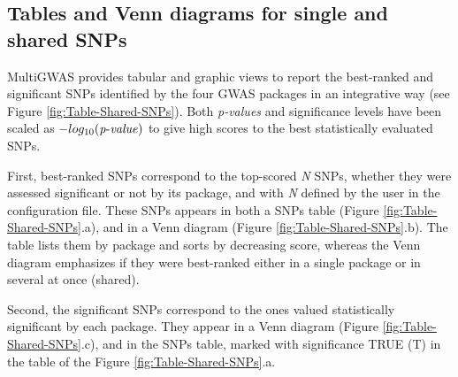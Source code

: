 \documentclass{article}
\begin{document}


\subsection{Tables and Venn diagrams for single and shared SNPs}

MultiGWAS provides tabular and graphic views to report the best-ranked and significant SNPs identified by the four GWAS packages in an integrative way (see Figure \ref{fig:Table-Shared-SNPs}). Both \emph{p-values} and significance levels have been scaled as $-log_{10}({\operatorname{\mathit{p-value}}})$ to give high scores to the best statistically evaluated SNPs.

First, best-ranked SNPs correspond to the top-scored \emph{N} SNPs, whether they were assessed significant or not by its package, and with\emph{ N} defined by the user in the configuration file. These SNPs appears in both a SNPs table (Figure \ref{fig:Table-Shared-SNPs}.a), and in a Venn diagram (Figure \ref{fig:Table-Shared-SNPs}.b). The table lists them by package and sorts by decreasing score, whereas the Venn diagram emphasizes if they were best-ranked either in a single package or in several at once (shared).

Second, the significant SNPs correspond to the ones valued statistically significant by each package. They appear in a Venn diagram (Figure \ref{fig:Table-Shared-SNPs}.c), and in the SNPs table, marked with significance TRUE (T) in the table of the Figure \ref{fig:Table-Shared-SNPs}.a.
\end{document}
